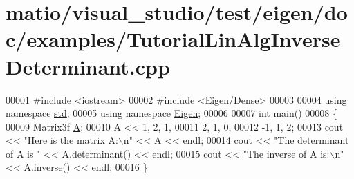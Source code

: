 \hypertarget{matio_2visual__studio_2test_2eigen_2doc_2examples_2_tutorial_lin_alg_inverse_determinant_8cpp_source}{}\section{matio/visual\+\_\+studio/test/eigen/doc/examples/\+Tutorial\+Lin\+Alg\+Inverse\+Determinant.cpp}
\label{matio_2visual__studio_2test_2eigen_2doc_2examples_2_tutorial_lin_alg_inverse_determinant_8cpp_source}

\begin{DoxyCode}
00001 \textcolor{preprocessor}{#include <iostream>}
00002 \textcolor{preprocessor}{#include <Eigen/Dense>}
00003 
00004 \textcolor{keyword}{using namespace }\hyperlink{namespacestd}{std};
00005 \textcolor{keyword}{using namespace }\hyperlink{namespace_eigen}{Eigen};
00006 
00007 \textcolor{keywordtype}{int} main()
00008 \{
00009    Matrix3f \hyperlink{group___core___module_class_eigen_1_1_matrix}{A};
00010    A << 1, 2, 1,
00011         2, 1, 0,
00012         -1, 1, 2;
00013    cout << \textcolor{stringliteral}{"Here is the matrix A:\(\backslash\)n"} << A << endl;
00014    cout << \textcolor{stringliteral}{"The determinant of A is "} << A.determinant() << endl;
00015    cout << \textcolor{stringliteral}{"The inverse of A is:\(\backslash\)n"} << A.inverse() << endl;
00016 \}
\end{DoxyCode}
